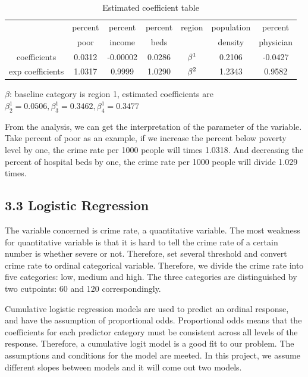 \documentclass[oneside,11pt]{homework}
\begin{document}
\begin{table}[!hbp]
\centering
\begin{tabular}{|c|c|c|c|c|c|c|}
\hline
\hline
&percent & percent & percent & region & population & percent  \\
&poor    & income  & beds    &        & density    & physician\\
\hline
coefficients & 0.0312 & -0.00002 & 0.0286 &  $\beta\footnotemark[1]$ & 0.2106 & -0.0427 \\
\hline
exp coefficients & 1.0317 & 0.9999 & 1.0290 &  $\beta\footnotemark[2]$ & 1.2343 & 0.9582 \\
\hline
\end{tabular}

\footnotesize{$\beta$\footnotemark[1]: baseline category is region 1, estimated coefficients are $\beta_2^1 = 0.0506, \beta_3^1= 0.3462, \beta_4^1=0.3477$}\\
\caption{Estimated coefficient table}
\end{table}

From the analysis, we can get the interpretation of the parameter of the variable. Take percent of poor as an example, if we increase the percent below poverty level by one, the crime rate per 1000 people will times 1.0318. And decreasing the percent of hospital beds by one, the crime rate per 1000 people will divide 1.029 times. 

\subsection*{3.3 Logistic Regression}
The variable concerned is crime rate, a quantitative variable. The most weakness for quantitative variable is that it is hard to tell the crime rate of a certain number is whether severe or not. Therefore, set several threshold and convert crime rate to ordinal categorical variable. Therefore, we divide the crime rate into five categories: low, medium and high. The three categories are distinguished by two cutpoints:  60\textperthousand{} and 120\textperthousand{} correspondingly.\par

Cumulative logistic regression models are used to predict an ordinal response, and have the assumption
of proportional odds. Proportional odds means that the coefficients for each predictor category must be
consistent across all levels of the response. Therefore, a cumulative logit model is a good fit to our problem. The assumptions and conditions for the model are meeted. In this project, we assume different slopes between models and it will come out two models.\par
\end{document}

